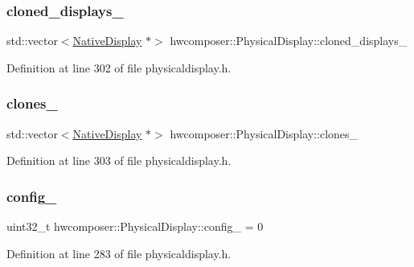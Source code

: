 \subsubsection{\texorpdfstring{cloned\+\_\+displays\+\_\+}{cloned\_displays\_}}
{\footnotesize\ttfamily std\+::vector$<$\mbox{\hyperlink{classhwcomposer_1_1NativeDisplay}{Native\+Display}} $\ast$$>$ hwcomposer\+::\+Physical\+Display\+::cloned\+\_\+displays\+\_\+\hspace{0.3cm}{\ttfamily [protected]}}



Definition at line 302 of file physicaldisplay.\+h.

\mbox{\label{classhwcomposer_1_1PhysicalDisplay_ab56848042a1534cdd00730e679350b95}} 
\subsubsection{\texorpdfstring{clones\+\_\+}{clones\_}}
{\footnotesize\ttfamily std\+::vector$<$\mbox{\hyperlink{classhwcomposer_1_1NativeDisplay}{Native\+Display}} $\ast$$>$ hwcomposer\+::\+Physical\+Display\+::clones\+\_\+\hspace{0.3cm}{\ttfamily [protected]}}



Definition at line 303 of file physicaldisplay.\+h.

\mbox{\label{classhwcomposer_1_1PhysicalDisplay_a75eb0d6243de4021ad8e49141becc4a0}} 
\subsubsection{\texorpdfstring{config\+\_\+}{config\_}}
{\footnotesize\ttfamily uint32\+\_\+t hwcomposer\+::\+Physical\+Display\+::config\+\_\+ = 0\hspace{0.3cm}{\ttfamily [protected]}}



Definition at line 283 of file physicaldisplay.\+h.

